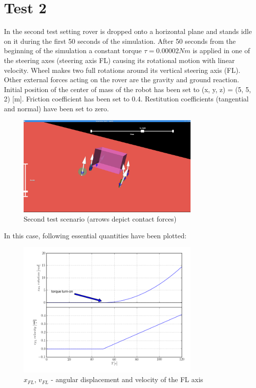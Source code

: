 \newpage
\section{Test 2}
\label{Sec:test_2}

In the second test setting rover is dropped onto a horizontal plane and stands idle on it during the first 50 seconds of the simulation.
After 50 seconds from the beginning of the simulation a constant torque $\tau = 0.00002Nm$ is applied in one of the steering axes (steering axis FL)
causing its rotational motion with linear velocity. Wheel makes two full rotations around its vertical steering axis (FL). 
Other external forces acting on the rover are the gravity and ground reaction. Initial position of the center of mass of the robot
has been set to (x, y, z) = (5, 5, 2) [m]. Friction coefficient has been set to 0.4. Restitution coefficients (tangential and normal) have been set to zero.

\begin{figure}[H]
  \centering
    \includegraphics[width=0.8\textwidth]{run_2}
  \caption{Second test scenario (arrows depict contact forces)}
\end{figure}

\noindent In this case, following essential quantities have been plotted:

\begin{figure}[H]
  \centering
    \includegraphics[width=0.8\textwidth]{xFLvFL}
  \caption{$x_{FL}$, $v_{FL}$ - angular displacement and velocity of the FL axis}
\end{figure}

